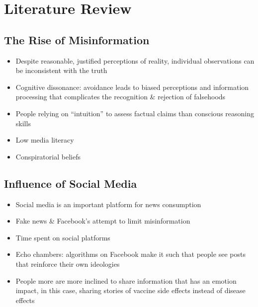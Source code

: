 \documentclass[12pt,]{article}
\providecommand{\tightlist}{%
  \setlength{\itemsep}{0pt}\setlength{\parskip}{0pt}}
\begin{document}
\hypertarget{literature-review}{%
\section{Literature Review}\label{literature-review}}

\hypertarget{the-rise-of-misinformation}{%
\subsection{The Rise of Misinformation}\label{the-rise-of-misinformation}}

\begin{itemize}
\tightlist
\item
  Despite reasonable, justified perceptions of reality, individual observations can be inconsistent with the truth \autocites{scheufele2019:misinformation}{turri2012:knowledge}
\item
  Cognitive dissonance: avoidance leads to biased perceptions and information processing that complicates the recognition \& rejection of falsehoods \autocite{festinger1957:dissonance}
\item
  People relying on ``intuition'' to assess factual claims than conscious reasoning skills \autocite{garrett2017:epistemic}
\item
  Low media literacy \autocite{lazer2018:fakenews}
\item
  Conspiratorial beliefs \autocite{uscinski2016:conspiracy}
\end{itemize}

\hypertarget{influence-of-social-media}{%
\subsection{Influence of Social Media}\label{influence-of-social-media}}

\begin{itemize}
\tightlist
\item
  Social media is an important platform for news consumption \autocites{perrin2019:fbuse}{brossard2013:socialmedia}
\item
  Fake news \& Facebook's attempt to limit misinformation \autocite{vosoughi2018:fakenews}
\item
  Time spent on social platforms
\item
  Echo chambers: algorithms on Facebook make it such that people see posts that reinforce their own ideologies \autocite{isaac2018:facebook}
\item
  People more are more inclined to share information that has an emotion impact, in this case, sharing stories of vaccine side effects instead of disease effects \autocite{milkman2014:sharing}
\end{itemize}
\end{document}

